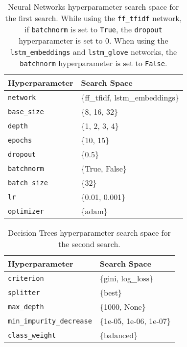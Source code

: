 \begin{table}[H]
\centering
\capstart
\begin{tabularx}{0.48\textwidth}{|l|X|}
\hline
Hyperparameter & Search Space \\
\hline
\texttt{network} & \{ff\_tfidf, lstm\_embeddings\} \\
\texttt{base\_size} & \{8, 16, 32\} \\
\texttt{depth} & \{1, 2, 3, 4\} \\
\texttt{epochs} & \{10, 15\} \\
\texttt{dropout} & \{0.5\} \\
\texttt{batchnorm} & \{True, False\} \\
\texttt{batch\_size} & \{32\} \\
\texttt{lr} & \{0.01, 0.001\} \\
\texttt{optimizer} & \{adam\} \\
\hline
\end{tabularx}
\caption{Neural Networks hyperparameter search space for the first search. While using the \texttt{ff\_tfidf} network, if \texttt{batchnorm} is set to \texttt{True}, the \texttt{dropout} hyperparameter is set to $0$. When using the \texttt{lstm\_embeddings} and \texttt{lstm\_glove} networks, the \texttt{batchnorm} hyperparameter is set to \texttt{False}.}
\label{tab:hyperparameters_neural_network_0}

\end{table}


\begin{table}[H]
\centering
\capstart
\begin{tabularx}{0.48\textwidth}{|l|X|}
\hline
Hyperparameter & Search Space \\
\hline
\texttt{criterion} & \{gini, log\_loss\} \\
\texttt{splitter} & \{best\} \\
\texttt{max\_depth} & \{1000, None\} \\
\texttt{min\_impurity\_decrease} & \{1e-05, 1e-06, 1e-07\} \\
\texttt{class\_weight} & \{balanced\} \\
\hline
\end{tabularx}
\caption{Decision Trees hyperparameter search space for the second search.}
\label{tab:hyperparameters_decision_tree_1}

\end{table}


